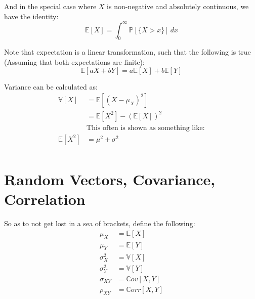 And in the special case where $X$ is non-negative and absolutely continuous, we
have the identity:
\begin{equation*}
    \mathbb{E}[X] = \int_{0}^{\infty} \mathbb{P}[\{X > x\}]  \,dx 
\end{equation*}

Note that expectation is a linear transformation, such that the following is
true (Assuming that both expectations are finite):
\begin{equation*}
    \mathbb{E}[aX + bY] = a \mathbb{E}[X] + b \mathbb{E}[Y] 
\end{equation*}

Variance can be calculated as: 
\begin{equation*}
    \begin{aligned}
        \mathbb{V}[X] &= \mathbb{E}[\left( X - \mu_X \right)^2]  \\
        &= \mathbb{E}[X^2] - (\mathbb{E}[X])^2 \\
        &\text{This often is shown as something like:} \\
        \mathbb{E}[X^2] &= \mu^2 + \sigma^2 \\
    \end{aligned}
\end{equation*}

\section{Random Vectors, Covariance, Correlation}
So as to not get lost in a sea of brackets, define the following:
\begin{equation*}
    \begin{aligned}
        \mu_X &= \mathbb{E}[X] \\
        \mu_Y &= \mathbb{E}[Y] \\
        \sigma_X^2 &= \mathbb{V}[X] \\
        \sigma_Y^2 &= \mathbb{V}[Y] \\
        \sigma_{XY} &= \mathbb{C}ov[X, Y]  \\
        \rho_{XY} &= \mathbb{C}orr[X, Y]  \\
    \end{aligned}
\end{equation*}

